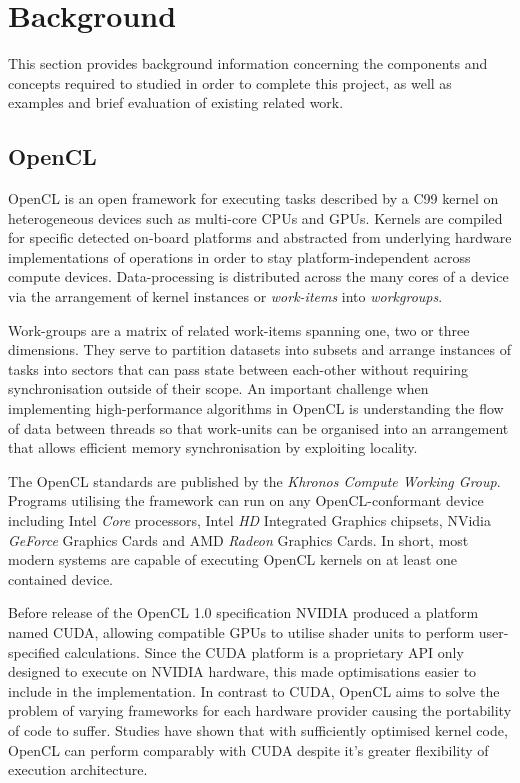 \section{Background}
This section provides background information concerning the components and concepts required to studied in order to complete this project, as well as examples and brief evaluation of existing related work.
\subsection{OpenCL}
OpenCL is an open framework for executing tasks described by a C99 kernel on heterogeneous devices such as multi-core CPUs and GPUs. Kernels are compiled for specific detected on-board platforms and abstracted from underlying hardware implementations of operations in order to stay platform-independent across compute devices. Data-processing is distributed across the many cores of a device via the arrangement of kernel instances or \emph{work-items} into \emph{workgroups}.

Work-groups are a matrix of related work-items spanning one, two or three dimensions. They serve to partition datasets into subsets and arrange instances of tasks into sectors that can pass state between each-other without requiring synchronisation outside of their scope. An important challenge when implementing high-performance algorithms in OpenCL is understanding the flow of data between threads so that work-units can be organised into an arrangement that allows efficient memory synchronisation by exploiting locality.

The OpenCL standards are published by the \emph{Khronos Compute Working Group}\cite{khronos}.
Programs utilising the framework can run on any OpenCL-conformant device including Intel \emph{Core} processors, Intel \emph{HD} Integrated Graphics chipsets, NVidia \emph{GeForce} Graphics Cards and AMD \emph{Radeon} Graphics Cards.
In short, most modern systems are capable of executing OpenCL kernels on at least one contained device.

Before release of the OpenCL 1.0 specification NVIDIA produced a platform named \ac{CUDA}, allowing compatible GPUs to utilise shader units to perform user-specified calculations. Since the CUDA platform is a proprietary API only designed to execute on NVIDIA hardware, this made optimisations easier to include in the implementation. In contrast to CUDA, OpenCL aims to solve the problem of varying frameworks for each hardware provider causing the portability of code to suffer. Studies have shown that with sufficiently optimised kernel code, OpenCL can perform comparably with CUDA despite it's greater flexibility of execution architecture\cite{perf}.

